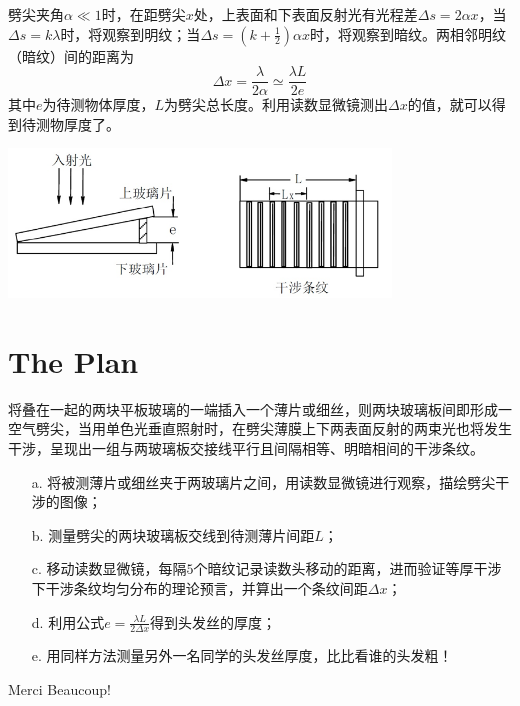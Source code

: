 \documentclass[CJK]{beamer}
\begin{document}
\begin{frame}
\bch
劈尖夹角$\alpha \ll 1$时，在距劈尖$x$处，上表面和下表面反射光有光程差$\Delta s = 2\alpha x$，当$\Delta s = k \lambda$时，将观察到明纹；当$\Delta s = (k + \frac{1}{2}) \alpha x$时，将观察到暗纹。两相邻明纹（暗纹）间的距离为
$$
\Delta x = \frac{\lambda}{2 \alpha} \simeq \frac{\lambda L}{2e}
$$
其中$e$为待测物体厚度，$L$为劈尖总长度。利用读数显微镜测出$\Delta x$的值，就可以得到待测物厚度了。
\ech
\end{frame}

\begin{frame}
\bch

\includegraphics[width=4in]{p1.png}

\ech
\end{frame}


\section{The Plan}
\begin{frame}
\bch
将叠在一起的两块平板玻璃的一端插入一个薄片或细丝，则两块玻璃板间即形成一空气劈尖，当用单色光垂直照射时，在劈尖薄膜上下两表面反射的两束光也将发生干涉，呈现出一组与两玻璃板交接线平行且间隔相等、明暗相间的干涉条纹。
\ech
\end{frame}

\begin{frame}
\bch

\begin{enumerate}
\item[a.] 将被测薄片或细丝夹于两玻璃片之间，用读数显微镜进行观察，描绘劈尖干涉的图像；
\item[b.] 测量劈尖的两块玻璃板交线到待测薄片间距$L$；
\item[c.] 移动读数显微镜，每隔$5$个暗纹记录读数头移动的距离，进而验证等厚干涉下干涉条纹均匀分布的理论预言，并算出一个条纹间距$\Delta x$；
\item[d.] 利用公式$e = \frac{\lambda L}{2 \Delta x}$得到头发丝的厚度；
\item[e.] 用同样方法测量另外一名同学的头发丝厚度，比比看谁的头发粗！
\end{enumerate}
\ech
\end{frame}



\begin{frame}
\bch
\begin{center}
Merci Beaucoup!
\end{center}
\ech
\end{frame}
\end{document}
